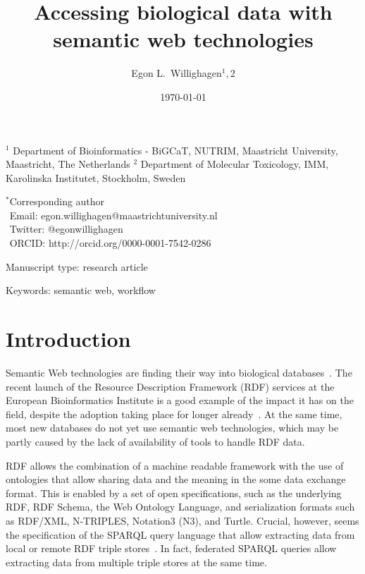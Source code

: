 \documentclass[12pt]{article}
\title{Accessing biological data with semantic web technologies}
\author{Egon L.\ Willighagen$^1,2$}
\begin{document}
\date{\today}
\maketitle

\noindent
$^1$ Department of Bioinformatics - BiGCaT, NUTRIM, Maastricht University, Maastricht, The Netherlands
$^2$ Department of Molecular Toxicology, IMM, Karolinska Institutet, Stockholm, Sweden

\bigskip
\noindent
$^*$Corresponding author\\
$\phantom{^*}$Email: egon.willighagen@maastrichtuniversity.nl\\
$\phantom{^*}$Twitter: @egonwillighagen\\
$\phantom{^*}$ORCID: http://orcid.org/0000-0001-7542-0286

\bigskip
\noindent
Manuscript type: research article

\bigskip
\noindent Keywords: semantic web, workflow

\newpage
\begin{abstract}
\end{abstract}

\section{Introduction}

Semantic Web technologies are finding their way into biological
databases~\cite{Belleau2008,Chen2010,Samwald2011,Williams2012,Willighagen2013}. The recent launch of the
Resource Description Framework (RDF) services at the European Bioinformatics Institute is a good example
of the impact it has on the field, despite the adoption taking place for longer already~\cite{EBIRDFPlatform}.
At the same time, most new databases do not yet use semantic web technologies, which may be partly
caused by the lack of availability of tools to handle RDF data.

RDF allows the combination of a machine readable framework with the use of ontologies that allow
sharing data and the meaning in the some data exchange format. This is enabled by a set of open
specifications, such as the underlying RDF, RDF Schema, the Web Ontology Language, and serialization formats
such as RDF/XML, N-TRIPLES, Notation3 (N3), and Turtle. Crucial, however, seems the specification of the SPARQL
query language that allow extracting data from local or remote RDF triple stores~\cite{Seaborne2009}. In fact,
federated SPARQL queries allow extracting data from multiple triple stores at the same time.
\end{document}
